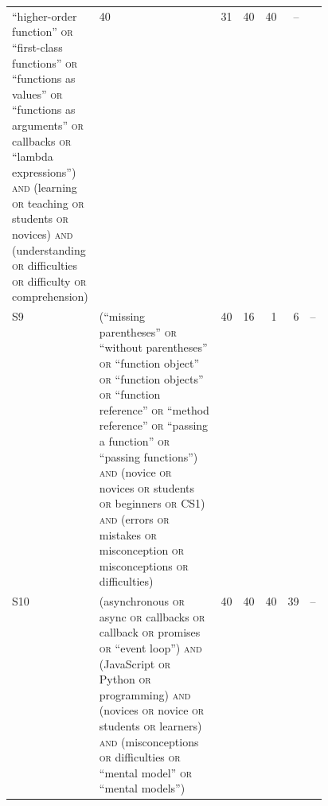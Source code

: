 \begin{table}[htbp]
\begin{tabular}{@{}lp{0.46\linewidth}rrrrr@{}}
       \enquote{higher-order function} \textsc{or} \enquote{first-class
       functions} \textsc{or} \enquote{functions as values} \textsc{or}
       \enquote{functions as arguments} \textsc{or} callbacks \textsc{or}
       \enquote{lambda expressions}) \textsc{and} (learning \textsc{or}
       teaching \textsc{or} students \textsc{or} novices) \textsc{and}
       (understanding \textsc{or} difficulties \textsc{or} difficulty
       \textsc{or} comprehension)
       & 40 & 31 & 40 & 40 & -- \\
    S9 & (\enquote{missing parentheses} \textsc{or} \enquote{without
       parentheses} \textsc{or} \enquote{function object} \textsc{or}
       \enquote{function objects} \textsc{or} \enquote{function
       reference} \textsc{or} \enquote{method reference} \textsc{or}
       \enquote{passing a function} \textsc{or} \enquote{passing
       functions}) \textsc{and} (novice \textsc{or} novices \textsc{or}
       students \textsc{or} beginners \textsc{or} CS1) \textsc{and}
       (errors \textsc{or} mistakes \textsc{or} misconception \textsc{or}
       misconceptions \textsc{or} difficulties)
       & 40 & 16 & 1 & 6 & -- \\
    S10 & (asynchronous \textsc{or} async \textsc{or} callbacks
       \textsc{or} callback \textsc{or} promises \textsc{or}
       \enquote{event loop}) \textsc{and} (JavaScript \textsc{or} Python
       \textsc{or} programming) \textsc{and} (novices \textsc{or} novice
       \textsc{or} students \textsc{or} learners) \textsc{and}
       (misconceptions \textsc{or} difficulties \textsc{or}
       \enquote{mental model} \textsc{or} \enquote{mental models})
       & 40 & 40 & 40 & 39 & -- \\
    \bottomrule
  \end{tabular}
\end{table}

